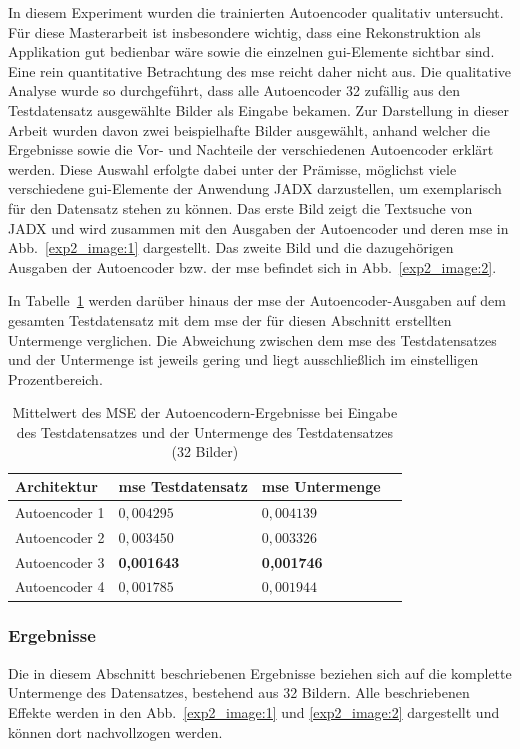 In diesem Experiment wurden die trainierten Autoencoder qualitativ untersucht. Für diese Masterarbeit ist insbesondere wichtig, dass eine Rekonstruktion als Applikation gut bedienbar wäre sowie die einzelnen \gls{gui}-Elemente sichtbar sind. Eine rein quantitative Betrachtung des \gls{mse} reicht daher nicht aus. Die qualitative Analyse wurde so durchgeführt, dass alle Autoencoder 32 zufällig aus den Testdatensatz ausgewählte Bilder als Eingabe bekamen. Zur Darstellung in dieser Arbeit wurden davon zwei beispielhafte Bilder ausgewählt, anhand welcher die Ergebnisse sowie die Vor- und Nachteile der verschiedenen Autoencoder erklärt werden. Diese Auswahl erfolgte dabei unter der Prämisse, möglichst viele verschiedene \gls{gui}-Elemente der Anwendung JADX darzustellen, um exemplarisch für den Datensatz stehen zu können. Das erste Bild zeigt die Textsuche von JADX und wird zusammen mit den Ausgaben der Autoencoder und deren \gls{mse} in Abb.~\ref{exp2_image:1} dargestellt. Das zweite Bild und die dazugehörigen Ausgaben der Autoencoder bzw. der \gls{mse} befindet sich in Abb.~\ref{exp2_image:2}.

In Tabelle~\ref{tab:exp2results_mse} werden darüber hinaus der \gls{mse} der Autoencoder-Ausgaben auf dem gesamten Testdatensatz mit dem \gls{mse} der für diesen Abschnitt erstellten Untermenge verglichen. Die Abweichung zwischen dem \gls{mse} des Testdatensatzes und der Untermenge ist jeweils gering und liegt ausschließlich im einstelligen Prozentbereich.

\begin{table}[htbp]
    \centering
    \caption{Mittelwert des MSE der Autoencodern-Ergebnisse bei Eingabe des Testdatensatzes und der Untermenge des Testdatensatzes (32 Bilder)}
    \label{tab:exp2results_mse}
    \smallskip
    \begin{tabular}{ llll }
        \toprule
        Architektur & \gls{mse} Testdatensatz & \gls{mse} Untermenge \\
        \hline
        Autoencoder 1 & $0,004295$ & $0,004139$\\
        Autoencoder 2 & $0,003450$ & $0,003326$\\
        Autoencoder 3 & \textbf{0,001643} & \textbf{0,001746}\\
        Autoencoder 4 & $0,001785$ & $0,001944$\\
        \bottomrule
    \end{tabular}
\end{table}

\subsubsection*{Ergebnisse}
Die in diesem Abschnitt beschriebenen Ergebnisse beziehen sich auf die komplette Untermenge des Datensatzes, bestehend aus 32 Bildern. Alle beschriebenen Effekte werden in den Abb.~\ref{exp2_image:1} und \ref{exp2_image:2} dargestellt und können dort nachvollzogen werden.

